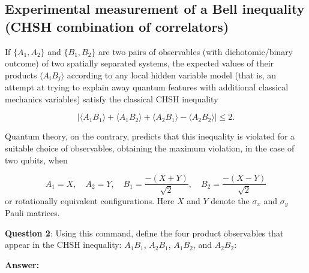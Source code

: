 \documentclass[11pt]{article}
\begin{document}
    \subsection*{\texorpdfstring{\textbf{Experimental measurement of a
Bell inequality (CHSH combination of
correlators)}}{Experimental measurement of a Bell inequality   (CHSH combination of correlators)}}\label{experimental-measurement-of-a-bell-inequality-chsh-combination-of-correlators}

If \(\{A_1, A_2\}\) and \(\{B_1,B_2\}\) are two pairs of observables
(with dichotomic/binary outcome) of two spatially separated systems, the
expected values of their products \(\langle A_i B_j \rangle\) according
to any local hidden variable model (that is, an attempt at trying to
explain away quantum features with additional classical mechanics
variables) satisfy the classical CHSH inequality

\[
|\langle A_1 B_1\rangle +\langle A_1 B_2\rangle + \langle A_2 B_1\rangle - \langle A_2 B_2\rangle|\leq 2 .
\]

Quantum theory, on the contrary, predicts that this inequality is
violated for a suitable choice of observables, obtaining the maximum
violation, in the case of two qubits, when

\[
A_1=X,\quad A_2=Y, \quad B_1=\frac{-(X+Y)}{\sqrt{2}}, \quad B_2=\frac{-(X-Y)}{\sqrt{2}}
\] or rotationally equivalent configurations. Here \(X\) and \(Y\)
denote the \(\sigma_x\) and \(\sigma_y\) Pauli matrices.

\textbf{Question 2}: Using this command,
define the four product observables that appear in the CHSH inequality:
\(A_1B_1\), \(A_2B_1\), \(A_1B_2\), and \(A_2B_2\):


\textbf{Answer:}
\end{document}
